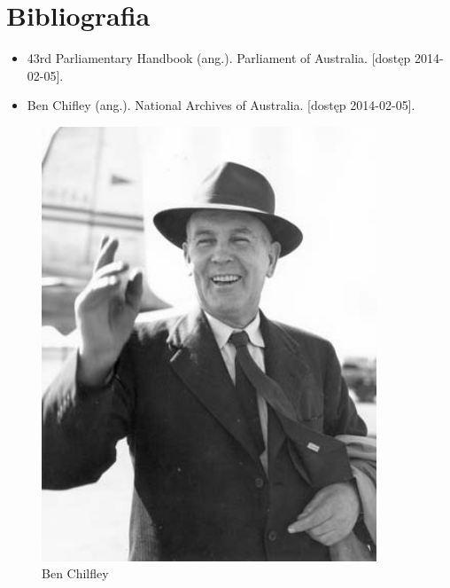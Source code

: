 \documentclass[a4paper,12pt]{article}
\begin{document}
\section {Bibliografia}
\begin{itemize}
\item 43rd Parliamentary Handbook (ang.). Parliament of Australia. [dostęp 2014-02-05].
\item Ben Chifley (ang.). National Archives of Australia. [dostęp 2014-02-05].
\end{itemize}

\begin{figure}
\centering
\includegraphics[width=10cm]{BenChifley.jpg}
\caption{Ben Chilfley}
\label{BenChifley.jpg}
\end{figure}


\end{document}
